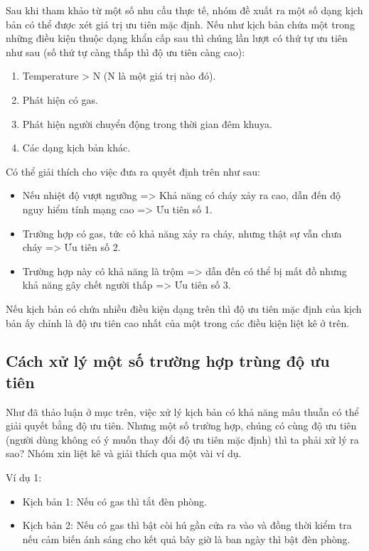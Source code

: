 \documentclass[12pt,a4paper,oneside]{extbook}
\begin{document}
Sau khi tham khảo từ một số nhu cầu thực tế, nhóm đề xuất ra một số dạng kịch bản có thể được xét giá trị ưu tiên mặc định. Nếu như kịch bản chứa một trong những điều kiện thuộc dạng khẩn cấp sau thì chúng lần lượt có thứ tự ưu tiên như sau (số thứ tự càng thấp thì độ ưu tiên càng cao):

\begin{enumerate}[topsep=1mm,itemsep=-0.5mm]
\item Temperature > N (N là một giá trị nào đó).
\item Phát hiện có gas.
\item Phát hiện người chuyển động trong thời gian đêm khuya.
\item Các dạng kịch bản khác.
\vspace{1mm}
\end{enumerate}

\noindent
Có thể giải thích cho việc đưa ra quyết định trên như sau:

\begin{itemize}[topsep=1mm,itemsep=-0.5mm]
\item Nếu nhiệt độ vượt ngưỡng => Khả năng có cháy xảy ra cao, dẫn đến độ nguy hiểm tính mạng cao => Ưu tiên số 1.
\item Trường hợp có gas, tức có khả năng xảy ra cháy, nhưng thật sự vẫn chưa cháy => Ưu tiên số 2.
\item Trường hợp này có khả năng là trộm => dẫn đến có thể bị mất đồ nhưng khả năng gây chết người thấp => Ưu tiên số 3.
\vspace{1mm}
\end{itemize}

\noindent
Nếu kịch bản có chứa nhiều điều kiện dạng trên thì độ ưu tiên mặc định của kịch bản ấy chỉnh là độ ưu tiên cao nhất của một trong các điều kiện liệt kê ở trên.

\subsection{Cách xử lý một số trường hợp trùng độ ưu tiên}

Như đã thảo luận ở mục trên, việc xử lý kịch bản có khả năng mâu thuẫn có thể giải quyết bằng độ ưu tiên. Nhưng một số trường hợp, chúng có cùng độ ưu tiên (người dùng không có ý muốn thay đổi độ ưu tiên mặc định) thì ta phải xử lý ra sao? Nhóm xin liệt kê và giải thích qua một vài ví dụ.

\noindent
Ví dụ 1:

\begin{itemize}[topsep=1mm,itemsep=-0.5mm]
\item Kịch bản 1: Nếu có gas thì tắt đèn phòng.
\item Kịch bản 2: Nếu có gas thì bật còi hú gần cửa ra vào và đồng thời kiểm tra nếu cảm biến ánh sáng cho kết quả bây giờ là ban ngày thì bật đèn phòng.
\vspace{1mm}
\end{itemize}
\end{document}
